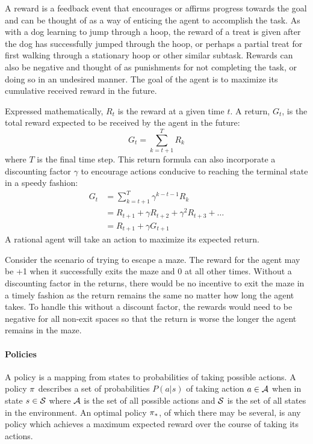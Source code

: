 A reward is a feedback event that encourages or affirms progress
towards the goal
and 
can be thought of as a way of enticing the agent to accomplish the task.
%
As with a dog learning to jump through a hoop,
the reward of a treat is given after the dog has successfully jumped
through the hoop,
or perhaps a partial treat for first walking through a stationary hoop
or other similar subtask.
%
Rewards can also be negative
and thought of as punishments for not completing the task,
or doing so in an undesired manner.
%
The goal of the agent is to maximize its cumulative received reward
in the future.

Expressed mathematically, $R_t$ is the reward at a given time $t$.
%
A return, $G_t$, is the total reward expected to be received by the agent
in the future:
\[
	G_t = \sum_{k=t+1}^{T} R_k
\]
where $T$ is the final time step.
%
This return formula can also incorporate a discounting factor $\gamma$ to
encourage actions conducive to reaching the terminal state in a speedy fashion:
\begin{align*}
	G_t &= \sum_{k=t+1}^{T} \gamma^{k-t-1} R_k \\
		&= R_{t+1} + \gamma R_{t+2} + \gamma^2 R_{t+3} + \ldots \\
		&= R_{t+1} + \gamma G_{t+1}
\end{align*}
%
A rational agent will take an action to maximize its expected return.

Consider the scenario of trying to escape a maze.
%
The reward for the agent may be +1 when it successfully exits the maze
and 0 at all other times.
%
Without a discounting factor in the returns,
there would be no incentive to exit the maze in a timely fashion
as the return remains the same no matter how long the agent takes.
%
To handle this without a discount factor,
the rewards would need to be negative for all non-exit spaces
so that the return is worse the longer the agent remains in the maze.


\paragraph*{Policies}

A policy is a mapping from states to probabilities of taking possible actions.
%
A policy $\pi$ describes a set of probabilities $P(a|s)$
of taking action $a \in \mathcal{A}$
when in state $s \in \mathcal{S}$
where $\mathcal{A}$ is the set of all possible actions
and $\mathcal{S}$ is the set of all states in the environment.
%
An optimal policy $\pi_*$,
of which there may be several,
is any policy which achieves a maximum expected reward over the course of
taking its actions.

